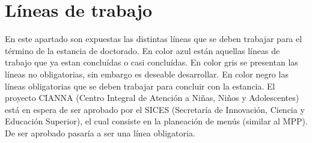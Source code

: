 \pagebreak
\section{Líneas de trabajo}
En este apartado son expuestas las distintas líneas que se deben trabajar para el término de la estancia de doctorado.
%
En color azul están aquellas líneas de trabajo que ya estan concluídas o casi concluídas.
%
En color gris se presentan las líneas no obligatorias, sin embargo es deseable desarrollar.
%
En color negro las líneas obligatorias que se deben trabajar para concluir con la estancia.
%
El proyecto CIANNA (Centro Integral de Atención a Niñas, Niños y Adolescentes) está en espera de ser aprobado por el SICES (Secretaría de Innovación, Ciencia y Educación Superior), el cual consiste en la planeación de menús (similar al MPP).
%
De ser aprobado pasaría a ser una línea obligatoria.

